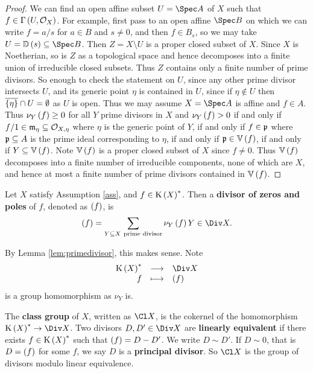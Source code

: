\begin{proof}
We can find an open affine subset $ U = \Spec A $ of $ X $ such that $ f \in \Gamma\br{U, \OOO_X} $. For example, first pass to an open affine $ \Spec B $ on which we can write $ f = a / s $ for $ a \in B $ and $ s \ne 0 $, and then $ f \in B_s $, so we may take $ U = \DD\br{s} \subseteq \Spec B $. Then $ Z = X \setminus U $ is a proper closed subset of $ X $. Since $ X $ is Noetherian, so is $ Z $ as a topological space and hence decomposes into a finite union of irreducible closed subsets. Thus $ Z $ contains only a finite number of prime divisors. So enough to check the statement on $ U $, since any other prime divisor intersects $ U $, and its generic point $ \eta $ is contained in $ U $, since if $ \eta \notin U $ then $ \overline{\cbr{\eta}} \cap U = \emptyset $ as $ U $ is open. Thus we may assume $ X = \Spec A $ is affine and $ f \in A $. Thus $ \nu_Y\br{f} \ge 0 $ for all $ Y $ prime divisors in $ X $ and $ \nu_Y\br{f} > 0 $ if and only if $ f / 1 \in \mathfrak{m}_\eta \subseteq \mathcal{O}_{X, \eta} $ where $ \eta $ is the generic point of $ Y $, if and only if $ f \in \mathfrak{p} $ where $ \mathfrak{p} \subseteq A $ is the prime ideal corresponding to $ \eta $, if and only if $ \ppp \in \VV\br{f} $, if and only if $ Y \subseteq \VV\br{f} $. Note $ \VV\br{f} $ is a proper closed subset of $ X $ since $ f \ne 0 $. Thus $ \VV\br{f} $ decomposes into a finite number of irreducible components, none of which are $ X $, and hence at most a finite number of prime divisors contained in $ \VV\br{f} $.
\end{proof}

\begin{definition*}
Let $ X $ satisfy Assumption \ref{ass}, and $ f \in \K\br{X}^* $. Then a \textbf{divisor of zeros and poles} of $ f $, denoted as $ \br{f} $, is
$$ \br{f} = \sum_{Y \subseteq X \ \text{prime divisor}} \nu_Y\br{f}Y \in \Div X. $$
\end{definition*}

By Lemma \ref{lem:primedivisor}, this makes sense. Note
$$ \function{\K\br{X}^*}{\Div X}{f}{\br{f}} $$
is a group homomorphism as $ \nu_Y $ is.

\begin{definition*}
The \textbf{class group} of $ X $, written as $ \Cl X $, is the cokernel of the homomorphism $ \K\br{X}^* \to \Div X $. Two divisors $ D, D' \in \Div X $ are \textbf{linearly equivalent} if there exists $ f \in \K\br{X}^* $ such that $ \br{f} = D - D' $. We write $ D \sim D' $. If $ D \sim 0 $, that is $ D = \br{f} $ for some $ f $, we say $ D $ is a \textbf{principal divisor}. So $ \Cl X $ is the group of divisors modulo linear equivalence.
\end{definition*}

